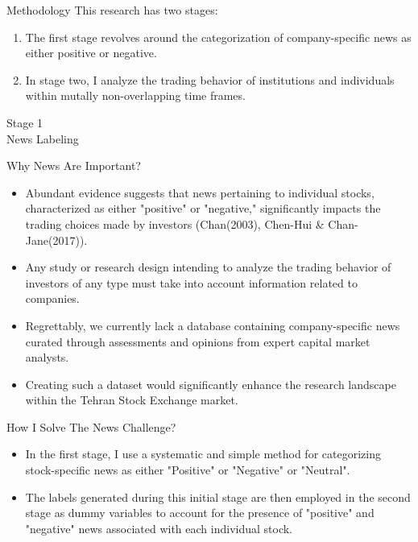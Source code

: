 \documentclass{beamer}
\begin{document}
\begin{frame}{Methodology}
    This research has two stages:
    \begin{enumerate}
        \item The first stage revolves around the categorization of company-specific news as either positive or negative.
        \item In stage two, I analyze the trading behavior of institutions and individuals within mutally non-overlapping time frames.
    \end{enumerate}
\end{frame}


\begin{frame}
    \Huge
    \center
    Stage 1
    \\
    News Labeling
\end{frame}

\begin{frame}{Why News Are Important?}
    \begin{itemize}
        \item Abundant evidence suggests that news pertaining to individual stocks, characterized as either "positive" or "negative," significantly impacts the trading choices made by investors (Chan(2003), Chen-Hui \& Chan-Jane(2017)).
        \item Any study or research design intending to analyze the trading behavior of investors of any type must take into account information related to companies.
        \item Regrettably, we currently lack a database containing company-specific news curated through assessments and opinions from expert capital market analysts.
        \item Creating such a dataset would significantly enhance the research landscape within the Tehran Stock Exchange market.
    \end{itemize}
\end{frame}

\begin{frame}{How I Solve The News Challenge?}
    \begin{itemize}
        \item In the first stage, I use a systematic and simple method for categorizing stock-specific news as either "Positive" or "Negative" or "Neutral".
        \item The labels generated during this initial stage are then employed in the second stage as dummy variables to account for the presence of "positive" and "negative" news associated with each individual stock.
    \end{itemize}
\end{frame}
\end{document}
